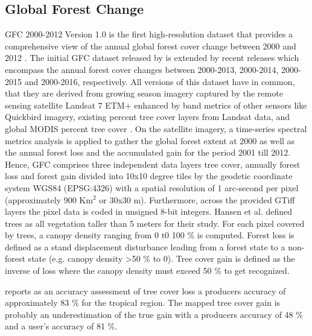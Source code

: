 	\subsection{Global Forest Change}
		\ac{GFC} 2000-2012 Version 1.0 is the first high-resolution dataset that provides a comprehensive view of the annual global forest cover change between 2000 and 2012 \citep{Hansen2013,Li2017}. The initial \ac{GFC} dataset released by \citeauthor{Hansen2013} is extended by recent releases which encompass the annual forest cover changes between 2000-2013, 2000-2014, 2000-2015 and 2000-2016, respectively. All versions of this dataset have in common, that they are derived from growing season imagery captured by the remote sensing satellite Landsat 7 \ac{ETM+} enhanced by band metrics of other sensors like Quickbird imagery, existing percent tree cover layers from Landsat data, and global \ac{MODIS} percent tree cover \citep{Hansen2013}. On the satellite imagery, a time-series spectral metrics analysis is applied to gather the global forest extent at 2000 as well as the annual forest loss and the accumulated gain for the period 2001 till 2012. Hence, \ac{GFC} comprises three independent data layers tree cover, annually forest loss and forest gain divided into 10x10 degree tiles by the geodetic coordinate system \ac{WGS84} (EPSG:4326) with a spatial resolution of 1 arc-second per pixel (approximately 900 Km$^2$ or 30x30 m). Furthermore, across the provided \ac{GTiff} layers the pixel data is coded in unsigned 8-bit integers. Hansen et al. defined trees as all vegetation taller than 5 meters for their study. For each pixel covered by trees, a canopy density ranging from 0 t0 100 \% is computed. Forest loss is defined as a stand displacement disturbance leading from a forest state to a non-forest state (e.g. canopy density >50 \% to 0). Tree cover gain is defined as the inverse of loss where the canopy density must exceed 50 \% to get recognized.

		\citeauthor{Hansen2013} reports as an accuracy assessment of tree cover loss a producers accuracy of approximately 83 \% for the tropical region. The mapped tree cover gain is probably an underestimation of the true gain with a producers accuracy of 48 \% and a user's accuracy of 81 \%. 

